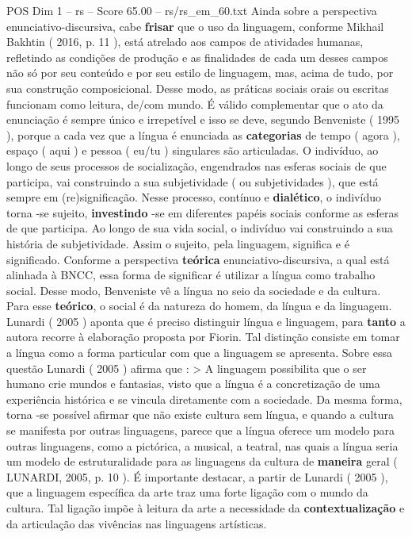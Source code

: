 \begin{textsample}{POS Dim 1 – rs – Score 65.00 – rs/rs\_em\_60.txt}
Ainda sobre a perspectiva enunciativo-discursiva, cabe \textbf{frisar} que o uso da linguagem, conforme Mikhail Bakhtin ( 2016, p. 11 ), está atrelado aos campos de atividades humanas, refletindo as condições de produção e as finalidades de cada um desses campos não só por seu conteúdo e por seu estilo de linguagem, mas, acima de tudo, por sua construção composicional.
Desse modo, as práticas sociais orais ou escritas funcionam como leitura, de/com mundo.
É válido complementar que o ato da enunciação é sempre único e irrepetível e isso se deve, segundo Benveniste ( 1995 ), porque a cada vez que a língua é enunciada as \textbf{categorias} de tempo ( agora ), espaço ( aqui ) e pessoa ( eu/tu ) singulares são articuladas.
O indivíduo, ao longo de seus processos de socialização, engendrados nas esferas sociais de que participa, vai construindo a sua subjetividade ( ou subjetividades ), que está sempre em (re)significação.
Nesse processo, contínuo e \textbf{dialético}, o indivíduo torna -se sujeito, \textbf{investindo} -se em diferentes papéis sociais conforme as esferas de que participa.
Ao longo de sua vida social, o indivíduo vai construindo a sua história de subjetividade.
Assim o sujeito, pela linguagem, significa e é significado.
Conforme a perspectiva \textbf{teórica} enunciativo-discursiva, a qual está alinhada à BNCC, essa forma de significar é utilizar a língua como trabalho social.
Desse modo, Benveniste vê a língua no seio da sociedade e da cultura.
Para esse \textbf{teórico}, o social é da natureza do homem, da língua e da linguagem.
Lunardi ( 2005 ) aponta que é preciso distinguir língua e linguagem, para \textbf{tanto} a autora recorre à elaboração proposta por Fiorin.
Tal distinção consiste em tomar a língua como a forma particular com que a linguagem se apresenta.
Sobre essa questão Lunardi ( 2005 ) afirma que : > A linguagem possibilita que o ser humano crie mundos e fantasias, visto que a língua é a concretização de uma experiência histórica e se vincula diretamente com a sociedade.
Da mesma forma, torna -se possível afirmar que não existe cultura sem língua, e quando a cultura se manifesta por outras linguagens, parece que a língua oferece um modelo para outras linguagens, como a pictórica, a musical, a teatral, nas quais a língua seria um modelo de estruturalidade para as linguagens da cultura de \textbf{maneira} geral ( LUNARDI, 2005, p. 10 ).
É importante destacar, a partir de Lunardi ( 2005 ), que a linguagem específica da arte traz uma forte ligação com o mundo da cultura.
Tal ligação impõe à leitura da arte a necessidade da \textbf{contextualização} e da articulação das vivências nas linguagens artísticas.

\end{textsample}
